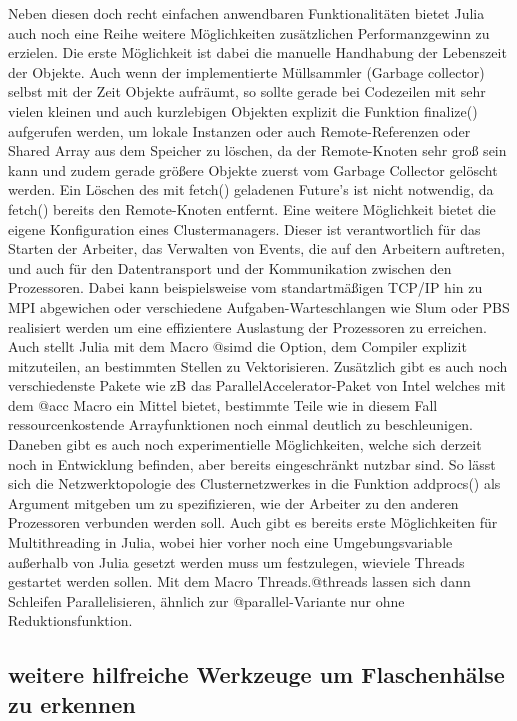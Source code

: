 \documentclass[proseminar,german,utf8]{zihpub}
\begin{document}
Neben diesen doch recht einfachen anwendbaren Funktionalitäten bietet Julia auch noch eine Reihe weitere Möglichkeiten zusätzlichen Performanzgewinn zu erzielen. Die erste Möglichkeit ist dabei die manuelle Handhabung der Lebenszeit der Objekte. Auch wenn der implementierte Müllsammler (Garbage collector) selbst mit der Zeit Objekte aufräumt, so sollte gerade bei Codezeilen mit sehr vielen kleinen und auch kurzlebigen Objekten explizit die Funktion finalize() aufgerufen werden, um lokale Instanzen oder auch Remote-Referenzen oder Shared Array aus dem Speicher zu löschen, da der Remote-Knoten sehr groß sein kann und zudem gerade größere Objekte zuerst vom Garbage Collector gelöscht werden. Ein Löschen des mit fetch() geladenen Future's ist nicht notwendig, da fetch() bereits den Remote-Knoten entfernt. Eine weitere Möglichkeit bietet die eigene Konfiguration eines Clustermanagers. Dieser ist verantwortlich für das Starten der Arbeiter, das Verwalten von Events, die auf den Arbeitern auftreten, und auch für den Datentransport und der Kommunikation zwischen den Prozessoren. Dabei kann beispielsweise vom standartmäßigen TCP/IP hin zu MPI abgewichen oder verschiedene Aufgaben-Warteschlangen wie Slum oder PBS realisiert werden um eine effizientere Auslastung der Prozessoren zu erreichen. Auch stellt Julia mit dem Macro @simd die Option, dem Compiler explizit mitzuteilen, an bestimmten Stellen zu Vektorisieren. Zusätzlich gibt es auch noch verschiedenste Pakete wie zB das ParallelAccelerator-Paket von Intel welches mit dem @acc Macro ein Mittel bietet, bestimmte Teile wie in diesem Fall ressourcenkostende Arrayfunktionen noch einmal deutlich zu beschleunigen. Daneben gibt es auch noch experimentielle Möglichkeiten, welche sich derzeit noch in Entwicklung befinden, aber bereits eingeschränkt nutzbar sind. So lässt sich die Netzwerktopologie des Clusternetzwerkes in die Funktion addprocs() als Argument mitgeben um zu spezifizieren, wie der Arbeiter zu den anderen Prozessoren verbunden werden soll. Auch gibt es bereits erste Möglichkeiten für Multithreading in Julia, wobei hier vorher noch eine Umgebungsvariable außerhalb von Julia gesetzt werden muss um festzulegen, wieviele Threads gestartet werden sollen. Mit dem Macro Threads.@threads lassen sich dann Schleifen Parallelisieren, ähnlich zur @parallel-Variante nur ohne Reduktionsfunktion.

\subsection{weitere hilfreiche Werkzeuge um Flaschenhälse zu erkennen}
\end{document}
